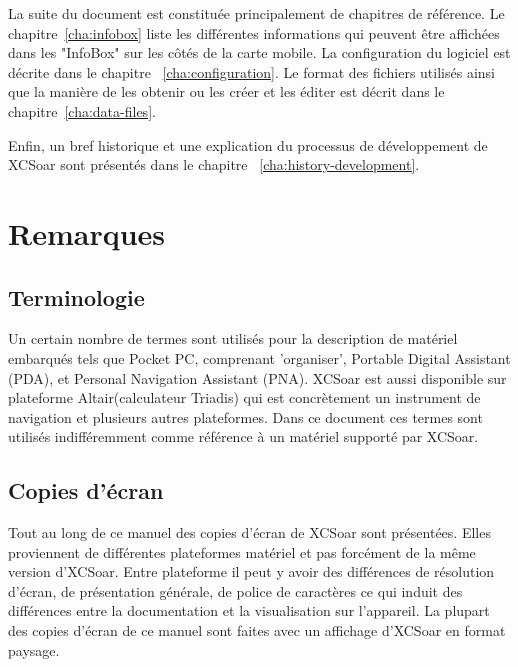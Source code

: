 La suite du document est constituée principalement de chapitres de référence. Le chapitre~\ref{cha:infobox} liste les différentes informations qui peuvent être affichées dans les "InfoBox" sur les côtés de la carte mobile. La configuration du logiciel est décrite dans le chapitre ~\ref{cha:configuration}. Le format des fichiers utilisés ainsi que la manière de les obtenir ou les créer et les éditer est décrit dans le chapitre~\ref{cha:data-files}.

Enfin, un bref historique et une explication du processus de développement de XCSoar sont présentés dans le chapitre ~\ref{cha:history-development}.

\section{Remarques}

\subsection*{Terminologie}
Un certain nombre de termes sont utilisés pour la description de matériel embarqués tels que Pocket PC, comprenant 'organiser', Portable Digital Assistant (PDA), et Personal Navigation Assistant (PNA). XCSoar est aussi disponible sur plateforme Altair(calculateur Triadis) qui est concrètement un instrument de navigation et plusieurs autres plateformes. Dans ce document ces termes sont utilisés indifféremment comme référence à un matériel supporté par XCSoar.

\subsection*{Copies d'écran}
Tout au long de ce manuel des copies d'écran de XCSoar sont présentées. Elles proviennent de différentes plateformes matériel et pas forcément de la même version d'XCSoar. Entre plateforme il peut y avoir des différences de résolution d'écran, de présentation générale, de police de caractères ce qui induit des différences entre la documentation et la visualisation sur l'appareil. La plupart des copies d'écran de ce manuel sont faites avec un affichage d'XCSoar en format paysage.

